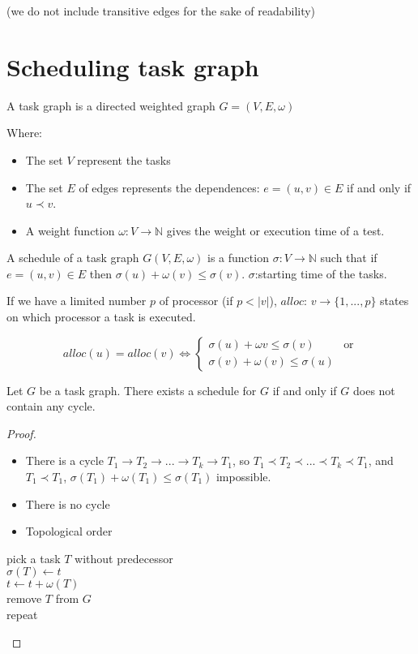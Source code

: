 (we do not include transitive edges for the sake of readability)

\section{Scheduling task graph}
\begin{defi}
A task graph is a directed weighted graph $G=(V,E,\omega )$

Where:
\begin{itemize}
\item The set $V$ represent the tasks
\item The set $E$ of edges represents the dependences: $e=(u,v) \in E $ if and only if $u\prec v$.
\item A weight function $\omega : V \to \mathbb{N} $ gives the weight or execution time of a test.
\end{itemize}
\end{defi}

\begin{defi}
A schedule of a task graph $G(V,E,\omega)$ is a function
$\sigma : V\to \mathbb{N}$ such that if $e=(u,v) \in E$ then $\sigma (u) + \omega (v) \leq \sigma (v)$. $\sigma$:starting time of the tasks.
\end{defi}

If we have a limited number $p$ of processor (if $p<|v|$), $alloc$: $v\to \{1,...,p\}$ states on which processor a task is executed.

\[alloc(u) = alloc (v) \Leftrightarrow 
\begin{cases}
\sigma(u) + \omega{v} \leq \sigma(v) & \text{or}\\
\sigma(v) + \omega(v) \leq \sigma(u)
\end{cases}\]

\begin{thm}
Let $G$ be a task graph. There exists a schedule for $G$ if and only if $G$ does not contain any cycle.
\end{thm}

\begin{proof}
\begin{itemize}
\item There is a cycle $T_1 \to T_2 \to ... \to T_k \to T_1$, so  $T_1 \prec T_2 \prec ... \prec T_k \prec T_1$, and $T_1\prec T_1$, $\sigma(T_1) + \omega(T_1) \leq \sigma(T_1)$ impossible.
\item There is no cycle
\item Topological order
\end{itemize}
\begin{algorithm}
pick a task $T$ without predecessor\\
$\sigma(T) \leftarrow t$\\
$t\leftarrow t + \omega(T)$\\
remove $T$ from $G$\\
repeat\\
\end{algorithm}
\end{proof}

